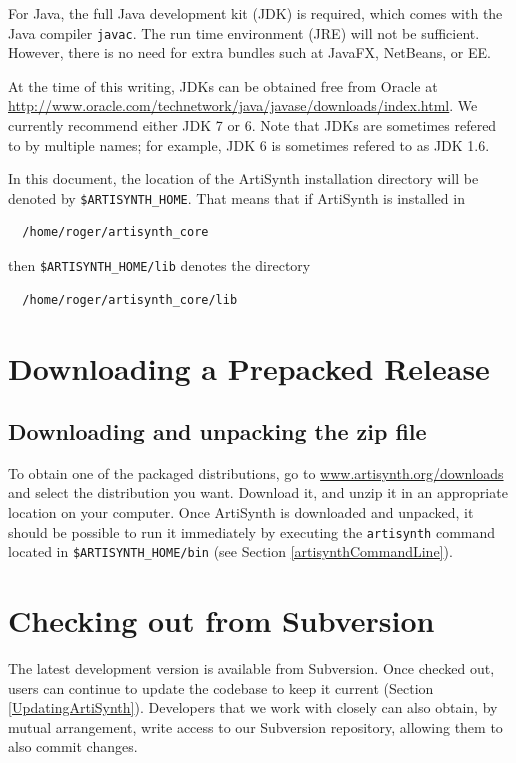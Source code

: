 \documentclass{article}
\def\SEP{/}
\def\directory{directory }
\begin{document}
For Java, the full Java development kit (JDK) is required, which comes
with the Java compiler {\tt javac}. The run time environment (JRE)
will not be sufficient. However, there is no need for extra bundles
such at JavaFX, NetBeans, or EE.

At the time of this writing, JDKs can be obtained free from Oracle at
\href{http://www.oracle.com/technetwork/java/javase/downloads/index.html}
{http://www.oracle.com/technetwork/java/javase/downloads/index.html}.
We currently recommend either JDK 7 or 6. Note that JDKs are sometimes
refered to by multiple names; for example, JDK 6 is sometimes refered
to as JDK 1.6.

In this document, the location of the ArtiSynth installation \directory
will be denoted by {\tt \$ARTISYNTH\_HOME}.  That
means that if ArtiSynth is installed in
\begin{verbatim}
  /home/roger/artisynth_core
\end{verbatim}
then {\tt \$ARTISYNTH\_HOME\SEP lib} denotes the \directory
\begin{verbatim}
  /home/roger/artisynth_core/lib
\end{verbatim}

\section{Downloading a Prepacked Release}
\label{PrepackagedRelease}

\subsection{Downloading and unpacking the zip file}

To obtain one of the packaged distributions, go to
\href{http://www.artisynth.org/downloads} 
{www.artisynth.org/downloads}
and select the distribution
you want. Download it, and unzip it in an appropriate location on your
computer.
Once ArtiSynth is downloaded and unpacked, it should be possible to
run it immediately by executing the {\tt artisynth} command located
in {\tt \$ARTISYNTH\_HOME\SEP bin} (see Section \ref{artisynthCommandLine}).

\section{Checking out from Subversion}
\label{SubversionCheckout}

The latest development version is available from Subversion. Once
checked out, users can continue to update the codebase to keep it
current (Section \ref{UpdatingArtiSynth}). Developers that we work
with closely can also obtain, by mutual arrangement, write access to
our Subversion repository, allowing them to also commit changes.
\end{document}
